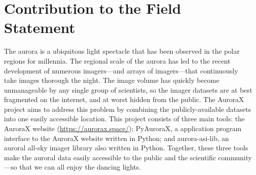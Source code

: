 \documentclass[utf8]{FrontiersinHarvard} %
\begin{document}
\section*{Contribution to the Field Statement}
\noindent The aurora is a ubiquitous light spectacle that has been observed in the polar regions for millennia. The regional scale of the aurora has led to the recent development of numerous imagers---and arrays of imagers---that continuously take images thorough the night. The image volume has quickly become unmanageable by any single group of scientists, so the imager datasets are at best fragmented on the internet, and at worst hidden from the public. The AuroraX project aims to address this problem by combining the publicly-available datasets into one easily accessible location. This project consists of three main tools:  the AuroraX website (\url{https://aurorax.space/}); PyAuroraX, a application program interface to the AuroraX website written in Python; and aurora-asi-lib, an auroral all-sky imager library also written in Python. Together, these three tools make the auroral data easily accessible to the public and the scientific community---so that we can all enjoy the dancing lights.

 

\end{document}
